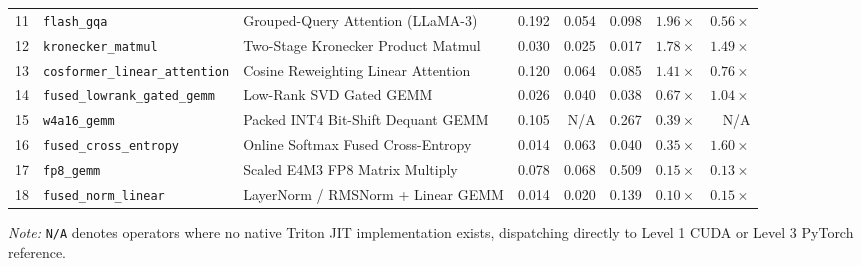 \begin{table}[t]
\begin{tabular}{rllrrrrr}
11 & \texttt{flash\_gqa} & Grouped-Query Attention (LLaMA-3) & 0.192 & 0.054 & 0.098 & $\mathbf{1.96\times}$ & $0.56\times$ \\
12 & \texttt{kronecker\_matmul} & Two-Stage Kronecker Product Matmul & 0.030 & 0.025 & 0.017 & $\mathbf{1.78\times}$ & $\mathbf{1.49\times}$ \\
13 & \texttt{cosformer\_linear\_attention} & Cosine Reweighting Linear Attention & 0.120 & 0.064 & 0.085 & $\mathbf{1.41\times}$ & $0.76\times$ \\
14 & \texttt{fused\_lowrank\_gated\_gemm} & Low-Rank SVD Gated GEMM & 0.026 & 0.040 & 0.038 & $0.67\times$ & $\mathbf{1.04\times}$ \\
15 & \texttt{w4a16\_gemm} & Packed INT4 Bit-Shift Dequant GEMM & 0.105 & N/A & 0.267 & $0.39\times$ & N/A \\
16 & \texttt{fused\_cross\_entropy} & Online Softmax Fused Cross-Entropy & 0.014 & 0.063 & 0.040 & $0.35\times$ & $\mathbf{1.60\times}$ \\
17 & \texttt{fp8\_gemm} & Scaled E4M3 FP8 Matrix Multiply & 0.078 & 0.068 & 0.509 & $0.15\times$ & $0.13\times$ \\
18 & \texttt{fused\_norm\_linear} & LayerNorm / RMSNorm + Linear GEMM & 0.014 & 0.020 & 0.139 & $0.10\times$ & $0.15\times$ \\
\bottomrule
\end{tabular}
\par\vspace{2pt}\raggedright\scriptsize \textit{Note:} \texttt{N/A} denotes operators where no native Triton JIT implementation exists, dispatching directly to Level 1 CUDA or Level 3 PyTorch reference.
\end{table}

